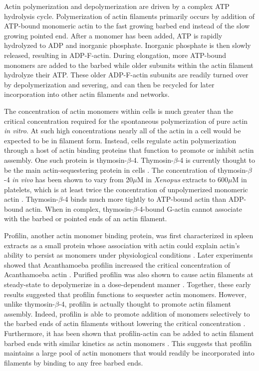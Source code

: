 \documentclass{ucetd}
\begin{document}
Actin polymerization and depolymerization are driven by a complex ATP hydrolysis cycle.  Polymerization of actin filaments primarily occurs by addition of ATP-bound monomeric actin to the fast growing barbed end instead of the slow growing pointed end.  After a monomer has been added, ATP is rapidly hydrolyzed to ADP and inorganic phosphate.  Inorganic phosphate is then slowly released, resulting in ADP-F-actin.  During elongation, more ATP-bound monomers are added to the barbed while older subunits within the actin filament hydrolyze their ATP.  These older ADP-F-actin subunits are readily turned over by depolymerization and severing, and can then be recycled for later incorporation into other actin filaments and networks.


The concentration of actin monomers within cells is much greater than the critical concentration required for the spontaneous polymerization of pure actin \textit{in vitro}.  At such high concentrations nearly all of the actin in a cell would be expected to be in filament form.  Instead, cells regulate actin polymerization through a host of actin binding proteins that function to promote or inhibit actin assembly.  One such protein is thymosin-$\beta$-4.  Thymosin-$\beta$-4 is currently thought to be the main actin-sequestering protein in cells \cite{Goldstein:2005kk}.  The concentration of thymosin-$\beta$-4 \textit{in vivo} has been shown to vary from 20$\mu$M in \textit{Xenopus} extracts to 600$\mu$M in platelets, which is at least twice the concentration of unpolymerized monomeric actin \cite{Pollard:2000bla}.  Thymosin-$\beta$-4 binds much more tightly to ATP-bound actin than ADP-bound actin.  When in complex, thymosin-$\beta$-4-bound G-actin cannot associate with the barbed or pointed ends of an actin filament.


Profilin, another actin monomer binding protein, was first characterized in spleen extracts as a small protein whose association with actin could explain actin's ability to persist as monomers under physiological conditions \cite{Carlsson:1977tv}.  Later experiments showed that Acanthamoeba profilin increased the critical concentration of Acanthamoeba actin \cite{Tseng:1982uc}.  Purified profilin was also shown to cause actin filaments at steady-state to depolymerize in a dose-dependent manner \cite{Tseng:1982uc}.  Together, these early results suggested that profilin functions to sequester actin monomers.  However, unlike thymosin-$\beta$-4, profilin is actually thought to promote actin filament assembly.  Indeed, profilin is able to promote addition of monomers selectively to the barbed ends of actin filaments without lowering the critical concentration \cite{Pring:1992us, Pollard:2000bla, Kang:1999wx}.  Furthermore, it has been shown that profilin-actin can be added to actin filament barbed ends with similar kinetics as actin monomers \cite{Kang:1999wx}.  This suggests that profilin maintains a large pool of actin monomers that would readily be incorporated into filaments by binding to any free barbed ends.
\end{document}
